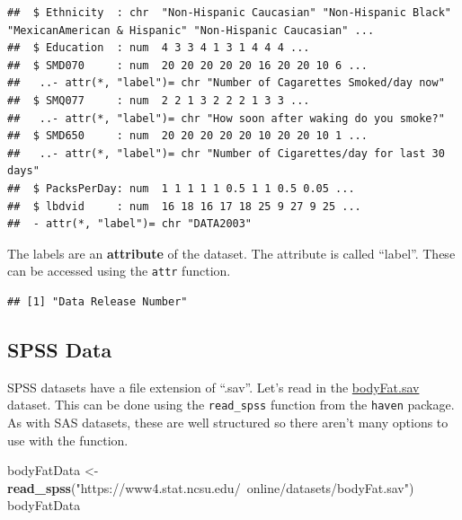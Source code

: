 \documentclass[
]{book}
\newenvironment{Shaded}{\begin{snugshade}}{\end{snugshade}}
\newcommand{\KeywordTok}[1]{\textcolor[rgb]{0.13,0.29,0.53}{\textbf{#1}}}
\newcommand{\NormalTok}[1]{#1}
\newcommand{\OperatorTok}[1]{\textcolor[rgb]{0.81,0.36,0.00}{\textbf{#1}}}
\newcommand{\StringTok}[1]{\textcolor[rgb]{0.31,0.60,0.02}{#1}}
\theoremstyle{definition}
\theoremstyle{definition}
\theoremstyle{definition}
\theoremstyle{remark}
\begin{document}
\begin{verbatim}
##  $ Ethnicity  : chr  "Non-Hispanic Caucasian" "Non-Hispanic Black" "MexicanAmerican & Hispanic" "Non-Hispanic Caucasian" ...
##  $ Education  : num  4 3 3 4 1 3 1 4 4 4 ...
##  $ SMD070     : num  20 20 20 20 20 16 20 20 10 6 ...
##   ..- attr(*, "label")= chr "Number of Cagarettes Smoked/day now"
##  $ SMQ077     : num  2 2 1 3 2 2 2 1 3 3 ...
##   ..- attr(*, "label")= chr "How soon after waking do you smoke?"
##  $ SMD650     : num  20 20 20 20 20 10 20 20 10 1 ...
##   ..- attr(*, "label")= chr "Number of Cigarettes/day for last 30 days"
##  $ PacksPerDay: num  1 1 1 1 1 0.5 1 1 0.5 0.05 ...
##  $ lbdvid     : num  16 18 16 17 18 25 9 27 9 25 ...
##  - attr(*, "label")= chr "DATA2003"
\end{verbatim}

The labels are an \textbf{attribute} of the dataset. The attribute is called ``label''. These can be accessed using the \texttt{attr} function.

\begin{Shaded}
\end{Shaded}

\begin{verbatim}
## [1] "Data Release Number"
\end{verbatim}

\hypertarget{spss-data}{%
\subsection{SPSS Data}\label{spss-data}}

SPSS datasets have a file extension of ``.sav''. Let's read in the \href{https://www4.stat.ncsu.edu/~online/datasets/bodyFat.sav}{bodyFat.sav} dataset. This can be done using the \texttt{read\_spss} function from the \texttt{haven} package. As with SAS datasets, these are well structured so there aren't many options to use with the function.

\begin{Shaded}
\begin{Highlighting}[]
\NormalTok{bodyFatData <-}\StringTok{ }\KeywordTok{read_spss}\NormalTok{(}\StringTok{"https://www4.stat.ncsu.edu/~online/datasets/bodyFat.sav"}\NormalTok{)}
\NormalTok{bodyFatData}
\end{Highlighting}
\end{Shaded}
\end{document}
